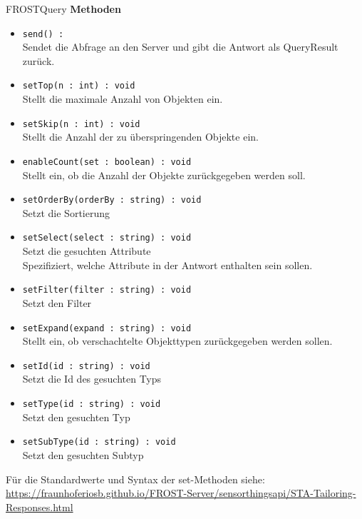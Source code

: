 \begin{Class}{FROSTQuery}
    \textbf{Methoden}
    \begin{itemize}
        \item \texttt{send() : }
        \\Sendet die Abfrage an den Server und gibt die Antwort als QueryResult zurück.
        \item \texttt{setTop(n : int) : void}
        \\Stellt die maximale Anzahl von Objekten ein.
        \item \texttt{setSkip(n : int) : void}
        \\Stellt die Anzahl der zu überspringenden Objekte ein.
        \item \texttt{enableCount(set : boolean) : void}
        \\Stellt ein, ob die Anzahl der Objekte zurückgegeben werden soll.
        \item \texttt{setOrderBy(orderBy : string) : void}
        \\Setzt die Sortierung
        \item \texttt{setSelect(select : string) : void}
        \\Setzt die gesuchten Attribute
        \\Spezifiziert, welche Attribute in der Antwort enthalten sein sollen.
        \item \texttt{setFilter(filter : string) : void}
        \\Setzt den Filter
        \item \texttt{setExpand(expand : string) : void}
        \\Stellt ein, ob verschachtelte Objekttypen zurückgegeben werden sollen.
        \item \texttt{setId(id : string) : void}
        \\Setzt die Id des gesuchten Typs
        \item \texttt{setType(id : string) : void}
        \\Setzt den gesuchten Typ
        \item \texttt{setSubType(id : string) : void}
        \\Setzt den gesuchten Subtyp
    \end{itemize}
    Für die Standardwerte und Syntax der set-Methoden siehe: 
    \\ \url{https://fraunhoferiosb.github.io/FROST-Server/sensorthingsapi/STA-Tailoring-Responses.html}
\end{Class}

